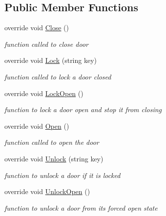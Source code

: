 \subsection*{Public Member Functions}
\begin{DoxyCompactItemize}
\item 
override void \mbox{\hyperlink{class_single_hinge_door_a19848e36fb259f92594916d1af76d3b4}{Close}} ()
\begin{DoxyCompactList}\small\item\em function called to close door \end{DoxyCompactList}\item 
override void \mbox{\hyperlink{class_single_hinge_door_a329ff33388675ec531996bdb33dd0c70}{Lock}} (string key)
\begin{DoxyCompactList}\small\item\em function called to lock a door closed \end{DoxyCompactList}\item 
override void \mbox{\hyperlink{class_single_hinge_door_aea7072ec0a9ea4fc80f24dc400681478}{Lock\+Open}} ()
\begin{DoxyCompactList}\small\item\em function to lock a door open and stop it from closing \end{DoxyCompactList}\item 
override void \mbox{\hyperlink{class_single_hinge_door_ad48e670701a9e9d35f97de3b8ff36208}{Open}} ()
\begin{DoxyCompactList}\small\item\em function called to open the door \end{DoxyCompactList}\item 
override void \mbox{\hyperlink{class_single_hinge_door_a130d674b08d4b9e8028b08ef2084ab77}{Unlock}} (string key)
\begin{DoxyCompactList}\small\item\em function to unlock a door if it is locked \end{DoxyCompactList}\item 
override void \mbox{\hyperlink{class_single_hinge_door_a5e5785f02f35b8b109d4c50d3f912013}{Unlock\+Open}} ()
\begin{DoxyCompactList}\small\item\em function to unlock a door from it\textquotesingle{}s forced open state \end{DoxyCompactList}\end{DoxyCompactItemize}
